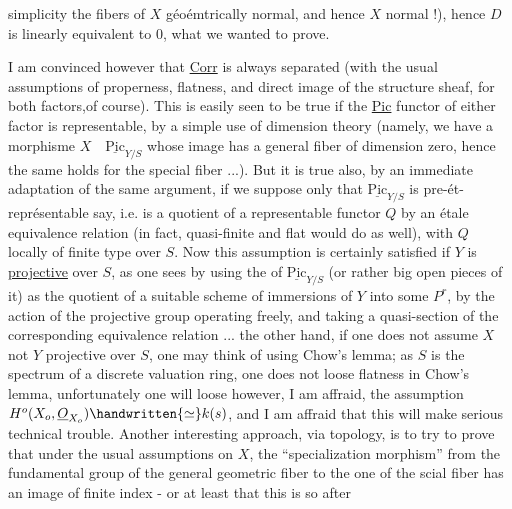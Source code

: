 simplicity the fibers of $X$ géoémtrically normal, and hence $X$ normal !), hence $D$ is linearly equivalent to $0$, what we wanted to prove.

I am convinced however that \uline{Corr} is always separated (with the usual assumptions of properness, flatness, and direct image of the structure sheaf, for both factors,of course). This is easily seen to be true if the \uline{Pic} functor of either factor is representable, by a simple use of dimension theory (namely, we have a morphisme $X\quad\underline{\mathrm{Pic}}_{Y/S}$ whose image has a general fiber of dimension zero, hence the same holds for the special fiber ...). But it is true also, by an immediate adaptation of the same argument, if we suppose only that $\underline{\mathrm{Pic}}_{Y/S}$ is pre-ét-représentable say, i.e. is a quotient of a representable functor $Q$ by an étale equivalence relation (in fact, quasi-finite and flat would do as well), with $Q$ locally of finite type over $S$. Now this assumption is certainly satisfied if $Y$ is \uline{projective} over $S$, as one sees by using the  of $\underline{\mathrm{Pic}}_{Y/S}$ (or rather big open pieces of it) as the quotient of a suitable scheme of immersions of $Y$ into some $P^{r}$, by the action of the projective group operating freely, and taking a quasi-section of the corresponding equivalence relation ...  the other hand, if one does not assume $X$ not $Y$ projective over $S$, one may think of using Chow's lemma; as $S$ is the spectrum of a discrete valuation ring, one does not loose flatness in  Chow's lemma, unfortunately one will loose however, I am affraid, the assumption $H^{o}(X_{o},\underline{O}_{X_{o}})\handwritten{\simeq}k(s)$, and I am affraid that this will make serious technical trouble. Another interesting approach, via topology, is to try to prove that under the usual assumptions on $X$, the ``specialization morphism'' from the fundamental group of the general geometric fiber to the one of the scial fiber has an image of finite index - or at least that this is so after
